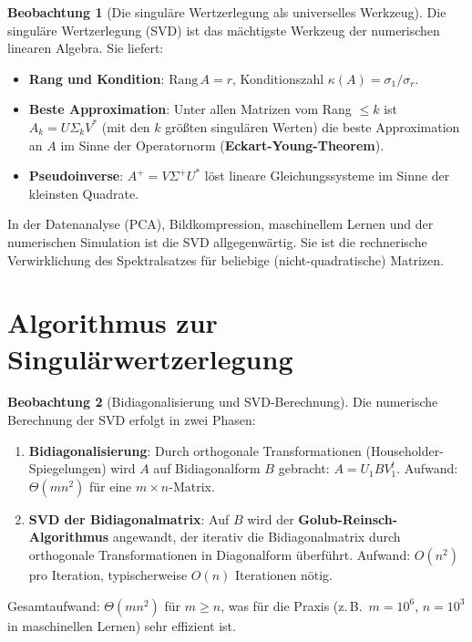 ﻿\documentclass[a4paper,12pt]{report}
\theoremstyle{definition}
\newtheorem{beobachtung}{Beobachtung}
\begin{document}
\begin{beobachtung}[Die singuläre Wertzerlegung als universelles Werkzeug]
    Die singuläre Wertzerlegung (SVD) ist das mächtigste Werkzeug der
    numerischen linearen Algebra. Sie liefert:
    \begin{itemize}
        \item[-] \textbf{Rang und Kondition}: $\mathrm{Rang}\, A = r$,
              Konditionszahl $\kappa(A) = \sigma_1 / \sigma_r$.
        \item[-] \textbf{Beste Approximation}: Unter allen Matrizen
              vom Rang $\leq k$ ist $A_k = U \Sigma_k V^*$ (mit den
              $k$ größten singulären Werten) die beste Approximation
              an $A$ im Sinne der Operatornorm (\textbf{Eckart-Young-Theorem}).
        \item[-] \textbf{Pseudoinverse}: $A^+ = V \Sigma^+ U^*$ löst
              lineare Gleichungssysteme im Sinne der kleinsten Quadrate.
    \end{itemize}
    In der Datenanalyse (PCA), Bildkompression, maschinellem Lernen und
    der numerischen Simulation ist die SVD allgegenwärtig. Sie ist die
    rechnerische Verwirklichung des Spektralsatzes für beliebige
    (nicht-quadratische) Matrizen.
\end{beobachtung}


\section{Algorithmus zur Singulärwertzerlegung}

\begin{beobachtung}[Bidiagonalisierung und SVD-Berechnung]
    Die numerische Berechnung der SVD erfolgt in zwei Phasen:
    \begin{enumerate}
        \item \textbf{Bidiagonalisierung}: Durch orthogonale
              Transformationen (Householder-Spiege\-lungen) wird $A$
              auf Bidiagonalform $B$ gebracht: $A = U_1 B V_1^t$.
              Aufwand: $\Theta(mn^2)$ für eine $m \times n$-Matrix.
        \item \textbf{SVD der Bidiagonalmatrix}: Auf $B$ wird der
              \textbf{Golub-Reinsch-Algorithmus} angewandt, der
              iterativ die Bidiagonalmatrix durch orthogonale
              Transformationen in Diagonalform überführt.
              Aufwand: $O(n^2)$ pro Iteration, typischerweise
              $O(n)$ Iterationen nötig.
    \end{enumerate}
    Gesamtaufwand: $\Theta(mn^2)$ für $m \geq n$, was für die
    Praxis (z.\,B.\ $m = 10^6$, $n = 10^3$ in maschinellen Lernen)
    sehr effizient ist.
\end{beobachtung}
\end{document}
